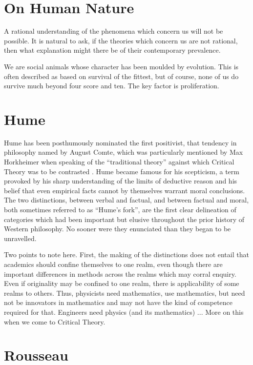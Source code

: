 \documentclass[10pt,titlepage]{article}
\begin{document}
\section{On Human Nature}

A rational understanding of the phenomena which concern us will not be possible.
It is natural to ask, if the theories which concern us are not rational, then what explanation might there be of their contemporary prevalence.

We are social animals whose character has been moulded by evolution.
This is often described as based on survival of the fittest, but of course, none of us do survive much beyond four score and ten.
The key factor is proliferation.


\section{Hume}

Hume has been posthumously nominated the first positivist, that tendency in philosophy named by August Comte, which was particularly mentioned by Max Horkheimer when speaking of the ``traditional theory'' against which Critical Theory was to be contrasted \cite{horkheimer-trad}.
Hume became famous for his scepticism, a term provoked by his sharp understanding of the limits of deductive reason and his belief that even empirical facts cannot by themselves warrant moral conclusions.
The two distinctions, between verbal and factual, and between factual and moral, both sometimes referred to as ``Hume's fork'', are the first clear delineation of categories which had been important but elusive throughout the prior history of Western philosophy.
No sooner were they enunciated than they began to be unravelled.

Two points to note here.
First, the making of the distinctions does not entail that academics should confine themselves to one realm, even though there are important differences in methods across the realms which may corral enquiry.
Even if originality may be confined to one realm, there is applicability of some realms to others.
Thus, physicists need mathematics, use mathematics, but need not be innovators in mathematics and may not have the kind of competence required for that.
Engineers need physics (and its mathematics) ...
More on this when we come to Critical Theory.

\section{Rousseau}
\end{document}
